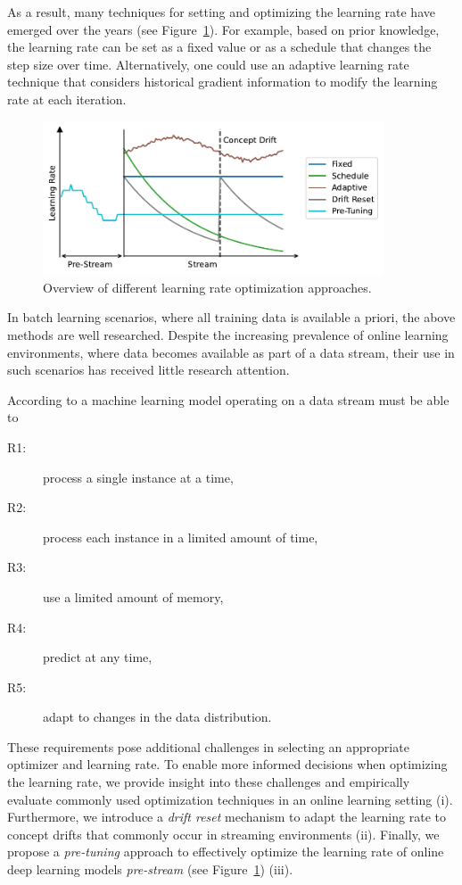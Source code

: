 \documentclass[runningheads]{llncs}
\begin{document}
As a result, many techniques for setting and optimizing the learning rate have emerged over the years (see Figure~\ref{fig:lr_overview}).
For example, based on prior knowledge, the learning rate can be set as a fixed value or as a schedule that changes the step size over time.
Alternatively, one could use an adaptive learning rate technique that considers historical gradient information to modify the learning rate at each iteration.
\begin{figure}[ht]
	\centering
	\includegraphics[width=0.9\textwidth]{figures/lr_overview.pdf}
	\caption{Overview of different learning rate optimization approaches.}
	\label{fig:lr_overview}
\end{figure}
In batch learning scenarios, where all training data is available a priori, the above methods are well researched.
Despite the increasing prevalence of online learning environments, where data becomes available as part of a data stream, their use in such scenarios has received little research attention.

According to \textcite{bifetMOAMassiveOnline2010} a machine learning model operating on a data stream must be able to
\begin{center}
	\begin{description}
		\item[R1:] process a single instance at a time,\label{rq:single_instance}
		\item[R2:] process each instance in a limited amount of time,\label{rq:limited_time}
		\item[R3:] use a limited amount of memory,\label{rq:limited_memory}
		\item[R4:] predict at any time,\label{rq:predict_any_time}
		\item[R5:] adapt to changes in the data distribution.\label{rq:adapt_to_drift}
	\end{description}
\end{center}

These requirements pose additional challenges in selecting an appropriate optimizer and learning rate.
To enable more informed decisions when optimizing the learning rate, we provide insight into these challenges and empirically evaluate commonly used optimization techniques in an online learning setting (i).
Furthermore, we introduce a \textit{drift reset} mechanism to adapt the learning rate to concept drifts that commonly occur in streaming environments (ii).
Finally, we propose a \textit{pre-tuning} approach to effectively optimize the learning rate of online deep learning models \textit{pre-stream} (see Figure~\ref{fig:lr_overview}) (iii).
\end{document}
